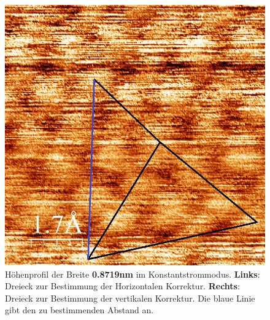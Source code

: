 \documentclass[12pt,a4paper]{article}
\begin{document}
\begin{figure}[H]
\includegraphics[scale=0.36]{Bilder/Atome/strom1_v.jpg}
\caption{Höhenprofil der Breite \textbf{0.8719nm} im Konstantstrommodus. \textbf{Links}: Dreieck zur Bestimmung der Horizontalen Korrektur. \textbf{Rechts}: Dreieck zur Bestimmung der vertikalen Korrektur. Die blaue Linie gibt den zu bestimmenden Abstand an.}
\end{figure}
\end{document}
